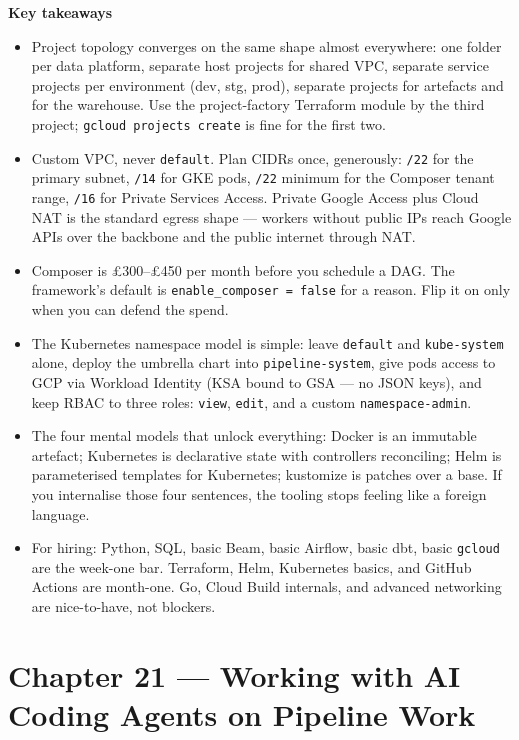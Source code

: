 \documentclass[
  11pt,
  british,
  oneside]{book}
\begin{document}
\begin{takeaways}
\textbf{Key takeaways}
\begin{itemize}
  \item Project topology converges on the same shape almost everywhere: one folder per data platform, separate host projects for shared VPC, separate service projects per environment (dev, stg, prod), separate projects for artefacts and for the warehouse. Use the project-factory Terraform module by the third project; \texttt{gcloud projects create} is fine for the first two.
  \item Custom VPC, never \texttt{default}. Plan CIDRs once, generously: \texttt{/22} for the primary subnet, \texttt{/14} for GKE pods, \texttt{/22} minimum for the Composer tenant range, \texttt{/16} for Private Services Access. Private Google Access plus Cloud NAT is the standard egress shape — workers without public IPs reach Google APIs over the backbone and the public internet through NAT.
  \item Composer is £300–£450 per month before you schedule a DAG. The framework's default is \texttt{enable\_composer = false} for a reason. Flip it on only when you can defend the spend.
  \item The Kubernetes namespace model is simple: leave \texttt{default} and \texttt{kube-system} alone, deploy the umbrella chart into \texttt{pipeline-system}, give pods access to GCP via Workload Identity (KSA bound to GSA — no JSON keys), and keep RBAC to three roles: \texttt{view}, \texttt{edit}, and a custom \texttt{namespace-admin}.
  \item The four mental models that unlock everything: Docker is an immutable artefact; Kubernetes is declarative state with controllers reconciling; Helm is parameterised templates for Kubernetes; kustomize is patches over a base. If you internalise those four sentences, the tooling stops feeling like a foreign language.
  \item For hiring: Python, SQL, basic Beam, basic Airflow, basic dbt, basic \texttt{gcloud} are the week-one bar. Terraform, Helm, Kubernetes basics, and GitHub Actions are month-one. Go, Cloud Build internals, and advanced networking are nice-to-have, not blockers.
\end{itemize}
\end{takeaways}
\newpage

\hypertarget{chapter-21-working-with-ai-coding-agents-on-pipeline-work}{%
\chapter{Chapter 21 --- Working with AI Coding Agents on Pipeline
Work}\label{chapter-21-working-with-ai-coding-agents-on-pipeline-work}}
\end{document}
